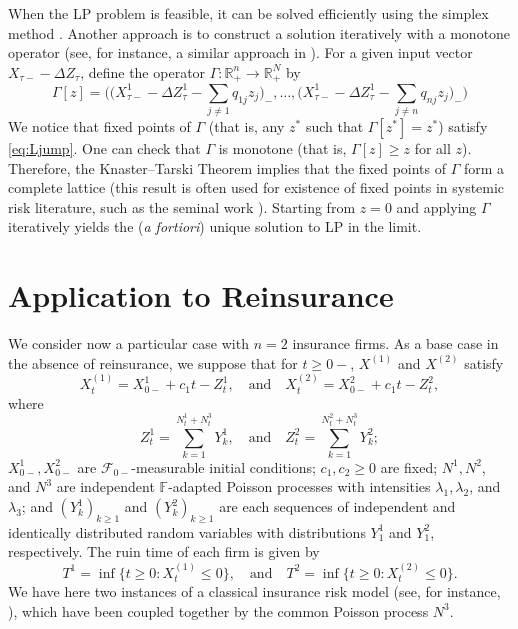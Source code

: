 \documentclass[12pt]{article}
\newcommand{\R}{\mathbb{R}}
\newcommand{\bF}{\mathbb{F}}
\newcommand{\calF}{\mathcal{F}}
\theoremstyle{plain}
\theoremstyle{definition}
\theoremstyle{remark}
\begin{document}
When the LP problem is feasible, it can be solved efficiently using the simplex method \cite{dantzig_linear_1997-1}. Another approach is to construct a solution iteratively with a monotone operator (see, for instance, a similar approach in \cite[Proposition 2.3]{cuchiero_propagation_2023}). For a given input vector $X_{\tau-}-\Delta Z_\tau$, define the operator $\Gamma:\R_+^n\to\R_+^N$ by
\begin{equation*}
\Gamma[z]=\bigg(\big(X_{\tau-}^1-\Delta Z_\tau^1-\sum_{j\neq 1} q_{1j} z_j\big)_-,\dots,\big(X_{\tau-}^1-\Delta Z_\tau^1-\sum_{j\neq n} q_{nj} z_j\big)_-\bigg)
\end{equation*}
We notice that fixed points of $\Gamma$ (that is, any $z^*$ such that $\Gamma[z^*]=z^*$) satisfy \eqref{eq:Ljump}. One can check that $\Gamma$ is monotone (that is, $\Gamma[z]\ge z$ for all $z$). Therefore, the Knaster--Tarski Theorem implies that the fixed points of $\Gamma$ form a complete lattice (this result is often used for existence of fixed points in systemic risk literature, such as the seminal work \cite{eisenberg_systemic_2001}). Starting from $z=0$ and applying $\Gamma$ iteratively yields the (\emph{a fortiori}) unique solution to LP in the limit. 

\section{Application to Reinsurance}\label{sec:app}

We consider now a particular case with $n=2$ insurance firms. As a base case in the absence of reinsurance, we suppose that for $t\ge 0-$, $X^{(1)}$ and $X^{(2)}$ satisfy 
\begin{equation*}
X^{(1)}_t=X^{1}_{0-}+c_1 t-Z^1_t,\quad\text{and}\quad
X^{(2)}_t=X^{2}_{0-}+c_1 t-Z^2_t,
\end{equation*}
where
\begin{equation*}
Z^1_t=\sum_{k=1}^{N^1_t+N^3_t} Y^1_k,\quad\text{and}\quad
Z^2_t=\sum_{k=1}^{N^2_t+N^3_t} Y^2_k;
\end{equation*}
$X^1_{0-},X^2_{0-}$ are $\calF_{0-}$-measurable initial conditions; $c_1,c_2\ge0$ are fixed; $N^1,N^2$, and $N^3$ are independent $\bF$-adapted Poisson processes with intensities $\lambda_1,\lambda_2$, and $\lambda_3$; and $(Y^1_k)_{k\ge1}$ and $(Y^2_k)_{k\ge1}$ are each sequences of independent and identically distributed random variables with distributions $Y^1_1$ and $Y^2_1$, respectively. The ruin time of each firm is given by
\begin{equation*}
T^1=\inf\{t\ge0: X^{(1)}_t\le 0\},\quad\text{and}\quad T^2=\inf\{t\ge0: X^{(2)}_t\le 0\}.
\end{equation*}
We have here two instances of a classical insurance risk model (see, for instance, \cite{kluppelberg_ruin_2004}), which have been coupled together by the common Poisson process $N^3$.
\end{document}
